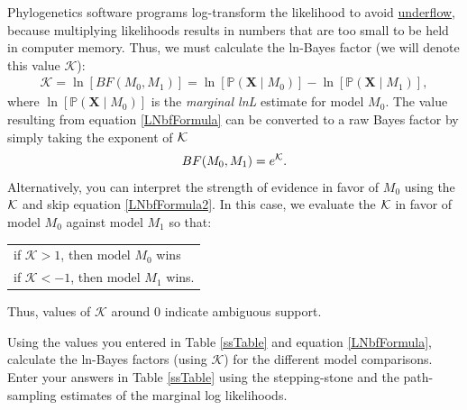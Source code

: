 Phylogenetics software programs log-transform the likelihood to avoid \href{http://en.wikipedia.org/wiki/Arithmetic_underflow}{underflow}, because multiplying likelihoods results in numbers that are too small to be held in computer memory.
Thus, we must calculate the ln-Bayes factor (we will denote this value $\mathcal{K}$):
\begin{align}\label{LNbfFormula}
\mathcal{K}=\ln[BF(M_0,M_1)] = \ln[\mathbb{P}(\mathbf X \mid M_0)]-\ln[\mathbb{P}(\mathbf X \mid M_1)],
\end{align}
where $\ln[\mathbb{P}(\mathbf X \mid M_0)]$ is the \textit{marginal lnL} estimate for model $M_0$. 
The value resulting from equation \ref{LNbfFormula} can be converted to a raw Bayes factor by simply taking the exponent of $\cal{K}$
\begin{align}\label{LNbfFormula2}
BF(M_0,M_1) = e^{\cal{K}}.
\end{align}
Alternatively, you can interpret the strength of evidence in favor of $M_0$ using the $\cal{K}$ and skip equation \ref{LNbfFormula2}. 
In this case, we evaluate the $\cal{K}$ in favor of model $M_0$ against model $M_1$ so that:
\begin{center}
\begin{tabular}{l}
if $\mathcal{K} > 1$, then model $M_0$ wins\\
if $\mathcal{K} < -1$, then model $M_1$ wins.
\end{tabular}
\end{center}
Thus, values of $\mathcal{K}$ around 0 indicate ambiguous support. 


Using the values you entered in Table \ref{ssTable} and equation \ref{LNbfFormula},  calculate the ln-Bayes factors (using $\mathcal{K}$) for the different model comparisons. 
Enter your answers in Table \ref{ssTable} using the stepping-stone and the path-sampling estimates of the marginal log likelihoods. 

